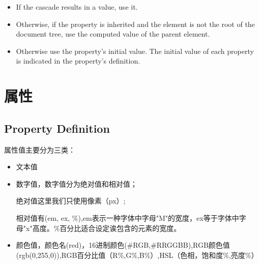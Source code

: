 \begin{itemize}
\item If the cascade results in a value, use it.
\item Otherwise, if the property is inherited and the element is not the root of the document tree, use the computed value of the parent element. 
\item Otherwise use the property's initial value. The initial value of each property is indicated in the property's definition. 
\end{itemize}






\section{属性}

\subsection{Property Definition}



属性值主要分为三类：

\begin{itemize}
\item 文本值
\item 数字值，数字值分为绝对值和相对值；

绝对值这里我们只使用像素（px）;

相对值有(em, ex, \%),em表示一种字体中字母"M"的宽度，ex等于字体中字母"x"高度。\%百分比适合设定诶包含的元素的宽度。

\item 颜色值，颜色名(red)，16进制颜色(\#RGB,\#RRGGBB),RGB颜色值(rgb(0,255,0)),RGB百分比值（R\%,G\%,B\%）,HSL（色相，饱和度\%,亮度\%）
\end{itemize}


